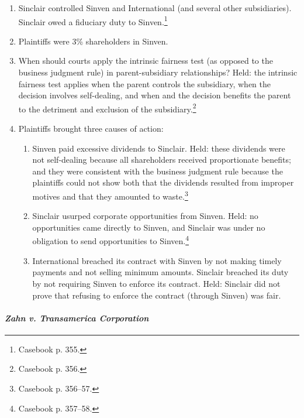 \begin{enumerate}
    \item Sinclair controlled Sinven and International (and several other 
    subsidiaries). Sinclair owed a fiduciary duty to Sinven.\footnote{Casebook 
    p. 355.}
    \item Plaintiffs were 3\% shareholders in Sinven.
    \item When should courts apply the intrinsic fairness test (as opposed to 
    the business judgment rule) in parent-subsidiary relationships? Held: the 
    intrinsic fairness test applies when the parent controls the subsidiary, 
    when the decision involves self-dealing, and when and the decision 
    benefits the parent to the detriment and exclusion of the 
    subsidiary.\footnote{Casebook p. 356.}
    \item Plaintiffs brought three causes of action:
    \begin{enumerate}
        \item Sinven paid excessive dividends to Sinclair. Held: these 
        dividends were not self-dealing because all shareholders received 
        proportionate benefits; and they were consistent with the 
        business judgment rule because the plaintiffs could not show both that 
        the dividends resulted from improper motives and that they amounted to 
        waste.\footnote{Casebook p. 356--57.}
        \item Sinclair usurped corporate opportunities from Sinven. Held: no 
        opportunities came directly to Sinven, and Sinclair was under no 
        obligation to send opportunities to Sinven.\footnote{Casebook p. 
        357--58.}
        \item International breached its contract with Sinven by not making 
        timely payments and not selling minimum amounts. Sinclair breached its 
        duty by not requiring Sinven to enforce its contract. Held: Sinclair 
        did not prove that refusing to enforce the contract (through Sinven) 
        was fair.
    \end{enumerate}
\end{enumerate}

\newpage %

\paragraph{\emph{Zahn v. Transamerica Corporation}}

